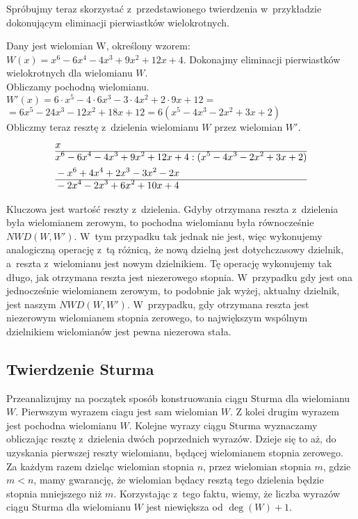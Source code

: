 Spróbujmy teraz skorzystać z~przedstawionego twierdzenia w~przykładzie dokonującym eliminacji pierwiastków wielokrotnych.

\begin{example}
	$ $ \\
	Dany jest wielomian W, określony wzorem: $W(x)=x^6-6x^4-4x^3+9x^2+12x+4$. Dokonajmy eliminacji pierwiastków wielokrotnych dla wielomianu $W$. \\
	Obliczamy pochodną wielomianu. \\
	$W'(x)=6 \cdot x^5-4 \cdot 6x^3-3 \cdot 4x^2+2 \cdot 9x+12=$ \\
	$=6x^5-24x^3-12x^2+18x+12=6(x^5-4x^3-2x^2+3x+2)$ \\
	Obliczmy teraz resztę z~dzielenia wielomianu $W$ przez wielomian $W'$.
	\begin{equation*}
	\begin{split}
		&x\\\hline
		&x^6-6x^4-4x^3+9x^2+12x+4 : (x^5-4x^3-2x^2+3x+2) \\
		&-x^6+4x^4+2x^3-3x^2-2x \\\hline
		&-2x^4-2x^3+6x^2+10x+4
	\end{split}
	\end{equation*}
	
	Kluczowa jest wartość reszty z~dzielenia. Gdyby otrzymana reszta z~dzielenia była wielomianem zerowym, to pochodna wielomianu była równocześnie $NWD(W, W')$. W~tym przypadku tak jednak nie jest, więc wykonujemy analogiczną operację z~tą różnicą, że nową dzielną jest dotychczasowy dzielnik, a~reszta z~wielomianu jest nowym dzielnikiem. Tę operację wykonujemy tak długo, jak otrzymana reszta jest niezerowego stopnia. W~przypadku gdy jest ona jednocześnie wielomianem zerowym, to podobnie jak wyżej, aktualny dzielnik, jest naszym $NWD(W, W')$. W~przypadku, gdy otrzymana reszta jest niezerowym wielomianem stopnia zerowego, to największym wspólnym dzielnikiem wielomianów jest pewna niezerowa stała.
\end{example}

\subsection{Twierdzenie Sturma}

Przeanalizujmy na początek sposób konstruowania ciągu Sturma dla wielomianu $W$. Pierwszym wyrazem ciagu jest sam wielomian $W$. Z kolei drugim wyrazem jest pochodna wielomianu $W$. Kolejne wyrazy ciągu Sturma wyznaczamy obliczając resztę z~dzielenia dwóch poprzednich wyrazów. Dzieje się to aż, do uzyskania pierwszej reszty wielomianu, będącej wielomianem stopnia zerowego. Za każdym razem dzieląc wielomian stopnia $n$, przez wielomian stopnia $m$, gdzie $m<n$, mamy gwarancję, że wielomian będacy resztą tego dzielenia będzie stopnia mniejszego niż $m$. Korzystając z~tego faktu, wiemy, że liczba wyrazów ciągu Sturma dla wielomianu $W$ jest niewiększa od $\deg(W)+1$.

